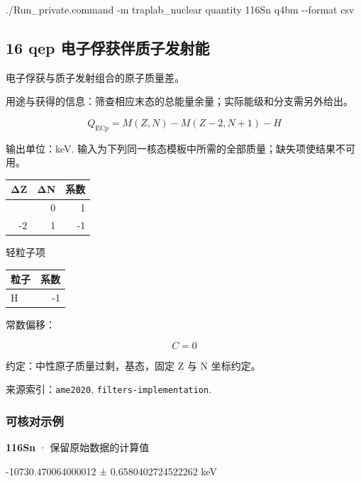 \documentclass[
  11pt,
  letterpaper,
]{article}
\newenvironment{Shaded}{}{}
\newcommand{\AttributeTok}[1]{\textcolor[rgb]{0.49,0.56,0.16}{#1}}
\newcommand{\ExtensionTok}[1]{#1}
\newcommand{\NormalTok}[1]{#1}
\begin{document}
\begin{Shaded}
\begin{Highlighting}[]
\ExtensionTok{./Run\_private.command} \AttributeTok{{-}m}\NormalTok{ traplab\_nuclear quantity 116Sn q4bm }\AttributeTok{{-}{-}format}\NormalTok{ csv}
\end{Highlighting}
\end{Shaded}

\subsection{16 qep
电子俘获伴质子发射能}\label{qep-ux7535ux5b50ux4fd8ux83b7ux4f34ux8d28ux5b50ux53d1ux5c04ux80fd}

电子俘获与质子发射组合的原子质量差。

用途与获得的信息：筛查相应末态的总能量余量；实际能级和分支需另外给出。

\[
Q_{{\mathrm{EC}}p}=M(Z,N)-M(Z-2,N+1)-H
\]

输出单位：keV.
输入为下列同一核态模板中所需的全部质量；缺失项使结果不可用。

\begin{longtable}[]{@{}rrr@{}}
\toprule\noalign{}
ΔZ & ΔN & 系数 \\
\midrule\noalign{}
\endhead
\bottomrule\noalign{}
\endlastfoot
0 & 0 & 1 \\
-2 & 1 & -1 \\
\end{longtable}

轻粒子项

\begin{longtable}[]{@{}lr@{}}
\toprule\noalign{}
粒子 & 系数 \\
\midrule\noalign{}
\endhead
\bottomrule\noalign{}
\endlastfoot
H & -1 \\
\end{longtable}

常数偏移：

\[
C=0
\]

约定：中性原子质量过剩，基态，固定 Z 与 N 坐标约定。

来源索引：\texttt{ame2020}, \texttt{filters-implementation}.

\subsubsection{可核对示例}\label{ux53efux6838ux5bf9ux793aux4f8b-15}

\textbf{116Sn} · 保留原始数据的计算值

-10730.470064000012 ± 0.6580402724522262 keV
\end{document}
